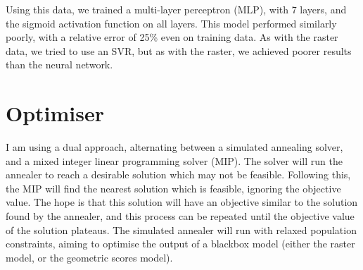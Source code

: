 \documentclass{article}
\begin{document}
Using this data, we trained a multi-layer perceptron (MLP), with 7 layers, and the sigmoid activation function on all layers. This model performed similarly poorly, with a relative error of 25\% even on training data. As with the raster data, we tried to use an SVR, but as with the raster, we achieved poorer results than the neural network.

\section{Optimiser}
I am using a dual approach, alternating between a simulated annealing solver, and a mixed integer linear programming solver (MIP). The solver will run the annealer to reach a desirable solution which may not be feasible. Following this, the MIP will find the nearest solution which is feasible, ignoring the objective value. The hope is that this solution will have an objective similar to the solution found by the annealer, and this process can be repeated until the objective value of the solution plateaus. The simulated annealer will run with relaxed population constraints, aiming to optimise the output of a blackbox model (either the raster model, or the geometric scores model).
\end{document}
